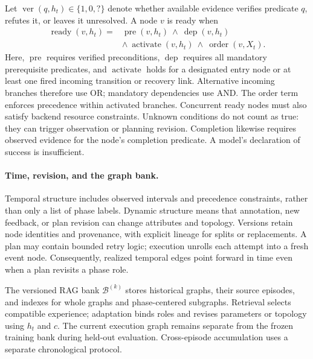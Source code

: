 Let $\operatorname{ver}(q,h_t)\in\{1,0,?\}$ denote whether available evidence verifies predicate $q$, refutes it, or leaves it unresolved. A node $v$ is ready when
\begin{equation}
\begin{split}
\operatorname{ready}(v,h_t)={}&
\operatorname{pre}(v,h_t)\ \land\ \operatorname{dep}(v,h_t)\\
&\land\ \operatorname{activate}(v,h_t)\ \land\ \operatorname{order}(v,X_t).
\end{split}
\label{eq:readiness}
\end{equation}
Here, $\operatorname{pre}$ requires verified preconditions, $\operatorname{dep}$ requires all mandatory prerequisite predicates, and $\operatorname{activate}$ holds for a designated entry node or at least one fired incoming transition or recovery link. Alternative incoming branches therefore use OR; mandatory dependencies use AND. The order term enforces precedence within activated branches. Concurrent ready nodes must also satisfy backend resource constraints. Unknown conditions do not count as true: they can trigger observation or planning revision. Completion likewise requires observed evidence for the node's completion predicate. A model's declaration of success is insufficient.

\paragraph{Time, revision, and the graph bank.}
Temporal structure includes observed intervals and precedence constraints, rather than only a list of phase labels. Dynamic structure means that annotation, new feedback, or plan revision can change attributes and topology. Versions retain node identities and provenance, with explicit lineage for splits or replacements. A plan may contain bounded retry logic; execution unrolls each attempt into a fresh event node. Consequently, realized temporal edges point forward in time even when a plan revisits a phase role.

The versioned RAG bank $\mathcal B^{(k)}$ stores historical graphs, their source episodes, and indexes for whole graphs and phase-centered subgraphs. Retrieval selects compatible experience; adaptation binds roles and revises parameters or topology using $h_t$ and $c$. The current execution graph remains separate from the frozen training bank during held-out evaluation. Cross-episode accumulation uses a separate chronological protocol.

